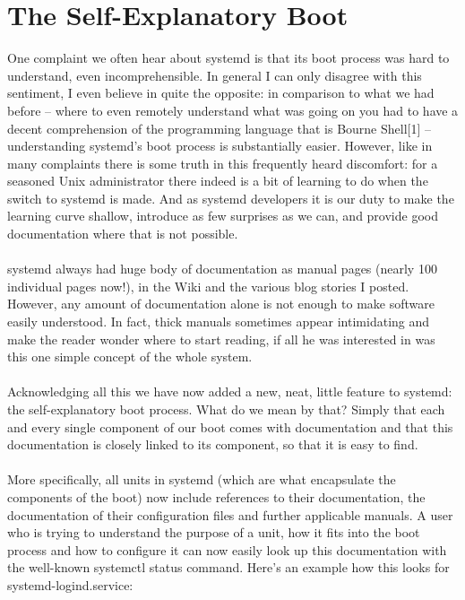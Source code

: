 \documentclass[titlepage]{article}
\begin{document}
\section{The Self-Explanatory Boot}
One complaint we often hear about systemd is that its boot process was hard to understand, even incomprehensible. In general I can only disagree with this sentiment, I even believe in quite the opposite: in comparison to what we had before -- where to even remotely understand what was going on you had to have a decent comprehension of the programming language that is Bourne Shell[1] -- understanding systemd's boot process is substantially easier. However, like in many complaints there is some truth in this frequently heard discomfort: for a seasoned Unix administrator there indeed is a bit of learning to do when the switch to systemd is made. And as systemd developers it is our duty to make the learning curve shallow, introduce as few surprises as we can, and provide good documentation where that is not possible.
\\
\\
systemd always had huge body of documentation as manual pages (nearly 100 individual pages now!), in the Wiki and the various blog stories I posted. However, any amount of documentation alone is not enough to make software easily understood. In fact, thick manuals sometimes appear intimidating and make the reader wonder where to start reading, if all he was interested in was this one simple concept of the whole system.
\\
\\
Acknowledging all this we have now added a new, neat, little feature to systemd: the self-explanatory boot process. What do we mean by that? Simply that each and every single component of our boot comes with documentation and that this documentation is closely linked to its component, so that it is easy to find.
\\
\\
More specifically, all units in systemd (which are what encapsulate the components of the boot) now include references to their documentation, the documentation of their configuration files and further applicable manuals. A user who is trying to understand the purpose of a unit, how it fits into the boot process and how to configure it can now easily look up this documentation with the well-known systemctl status command. Here's an example how this looks for systemd-logind.service:
\end{document}
